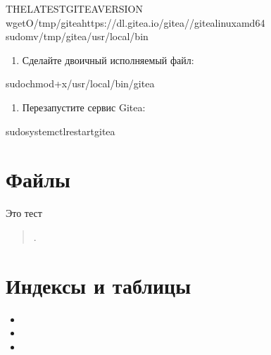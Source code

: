 \documentclass[letterpaper,10pt,russian]{sphinxmanual}
\begin{document}
\begin{sphinxVerbatim}[commandchars=\\\{\}]
\PYGZdl{}\PYGZlt{}THE\PYGZus{}LATEST\PYGZus{}GITEA\PYGZus{}VERSION\PYGZgt{}
\PYGZdl{}wget\PYGZhy{}O/tmp/giteahttps://dl.gitea.io/gitea//gitea\PYGZhy{}\PYGZhy{}linux\PYGZhy{}amd64
\PYGZdl{}sudomv/tmp/gitea/usr/local/bin
\end{sphinxVerbatim}
\begin{enumerate}
%
\setcounter{enumi}{2}
\item {} 
\sphinxAtStartPar
Сделайте двоичный исполняемый файл:

\end{enumerate}

\begin{sphinxVerbatim}[commandchars=\\\{\}]
\PYGZdl{}sudochmod+x/usr/local/bin/gitea
\end{sphinxVerbatim}
\begin{enumerate}
%
\setcounter{enumi}{3}
\item {} 
\sphinxAtStartPar
Перезапустите сервис Gitea:

\end{enumerate}

\begin{sphinxVerbatim}[commandchars=\\\{\}]
\PYGZdl{}sudosystemctlrestartgitea
\end{sphinxVerbatim}

\sphinxstepscope


\chapter{Файлы}
\label{\detokenize{files:id1}}\label{\detokenize{files::doc}}
\sphinxAtStartPar
Это тест
\begin{quote}

\sphinxAtStartPar
{}.
\end{quote}


\chapter{Индексы и таблицы}
\label{\detokenize{index:id1}}\begin{itemize}
\item {} 
\sphinxAtStartPar
{}

\item {} 
\sphinxAtStartPar
{}

\item {} 
\sphinxAtStartPar
{}

\end{itemize}
\end{document}
